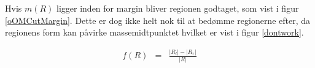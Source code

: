 {Hvis $m(R)$ ligger inden for margin bliver regionen godtaget, som vist i
figur \ref{oOMCutMargin}. Dette er dog ikke helt nok til at bedømme
regionerne efter, da regionens form kan påvirke massemidtpunktet hvilket
er vist i figur \ref{dontwork}.


\begin{eqnarray}
    f(R) & = & \frac{|R_{l}| - |R_{r}|}{|R|}
    \label{Fordeling}
\end{eqnarray}





}
